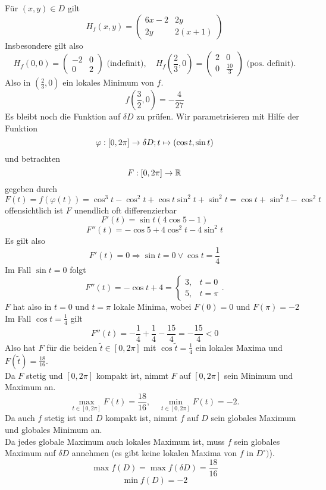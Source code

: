 \documentclass[../ana2u.tex]{subfiles}
\begin{document}
\begin{bsp}
    Für \((x,y) \in D\) gilt
    \[ H_f(x,y) = \begin{pmatrix}
        6x-2 & 2y\\
        2y & 2(x+1)
    \end{pmatrix} \]
    Insbesondere gilt also 
    \[ H_f(0,0) = \begin{pmatrix}
        -2 & 0 \\ 0 & 2
    \end{pmatrix} \text{ (indefinit)}, \quad
    H_f(\frac{2}{3}, 0) = \begin{pmatrix}
        2 & 0 \\ 0 & \frac{10}{3}
    \end{pmatrix}\text{ (pos. definit)}. \]
    Also in \((\frac{2}{3}, 0)\) ein lokales Minimum von \(f\).
    \[ f(\frac{3}{2}, 0) = -\frac{4}{27} \]
    Es bleibt noch die Funktion auf \(\delta D\) zu prüfen.
    Wir parametrisieren mit Hilfe der Funktion
    \[ \varphi:[0,2\pi]\rightarrow \delta D; t \mapsto (\cos t, \sin t) \]
    und betrachten
    \[ F:[0,2\pi]\rightarrow \mathbb{R} \]
    gegeben durch
    \[ F(t) = f(\varphi(t)) = \cos^3 t-\cos^2 t + \cos t \sin^2 t + \sin^2 t 
    = \cos t + \sin^2 t - \cos^2 t\]
    offensichtlich ist \(F\) unendlich oft differenzierbar
    \[ F'(t) = \sin t (4\cos 5 - 1) \]
    \[ F''(t) = -\cos 5 + 4\cos^2 t - 4 \sin^2 t  \]
    Es gilt also 
    \[ F'(t) = 0 \Rightarrow \sin t = 0 \vee \cos t = \frac{1}{4} \]
    Im Fall \( \sin t = 0 \) folgt 
    \[ F''(t) = -\cos t + 4 = \begin{cases}
        3, & t = 0\\
        5, & t = \pi
    \end{cases}. \]
    \(F\) hat also in \(t = 0\) und \(t = \pi\) lokale Minima, wobei
    \(F(0) = 0\) und \(F(\pi) = -2\) \\
    Im Fall \(\cos t = \frac{1}{4}\) gilt
    \[ F''(t) = - \frac{1}{4} + \frac{1}{4} - \frac{15}{4} 
    = - \frac{15}{4} < 0 \]
    Also hat \(F\) für die beiden \( \tilde{t} \in [0,2\pi] \) 
    mit \( \cos \tilde{t} = \frac{1}{4} \) ein lokales Maxima und
    \(F(\tilde{t}) = \frac{18}{16}\).\\
    Da \(F\) stetig und \([0,2\pi]\) kompakt ist, nimmt \(F\) auf \([0,2\pi]\)
    sein Minimum und Maximum an.
    \[ \underset{t\in [0,2\pi]}{\max} F(t) = \frac{18}{16}, \quad
    \underset{t\in [0,2\pi]}{\min} F(t) = -2. \]
    Da auch \(f\) stetig ist und \(D\) kompakt ist, nimmt \(f\) auf \(D\)
    sein globales Maximum und globales Minimum an.\\
    Da jedes globale Maximum auch lokales Maximum ist, muss \(f\) sein 
    globales Maximum auf \(\delta D\) annehmen 
    (es gibt keine lokalen Maxima von \(f\) in \(D^\circ)\)).
    \[ \max f(D) = \max f(\delta D) = \frac{18}{16} \]
    \[ \min f(D) = -2 \]
\end{bsp}
\end{document}
